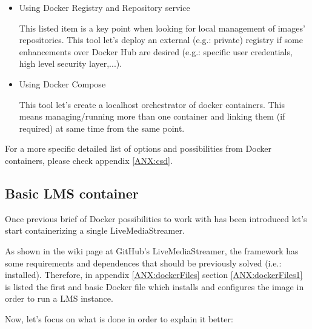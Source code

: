 \begin{itemize}
\begin{itemize}
	\item Using Docker Registry and Repository service

	This	 listed item is a key point when looking for local management of images' repositories. This tool let's deploy an external (e.g.: private) registry if some enhancements over Docker Hub are desired (e.g.: specific user credentials, high level security layer,...).
	
	\item Using Docker Compose
	
	This tool let's create a localhost orchestrator of docker containers. This means managing/running more than one container and linking them (if required) at same time from the same point.
	
	\end{itemize}
\end{itemize}

For a more specific detailed list of options and possibilities from Docker containers, please check appendix \ref{ANX:csd}.

\subsection{Basic LMS container}

Once previous brief of Docker possibilities to work with has been introduced let's start containerizing a single LiveMediaStreamer.

As shown in the wiki page at GitHub's LiveMediaStreamer, the framework has some requirements and dependences that should be previously solved (i.e.: installed). Therefore, in appendix \ref{ANX:dockerFiles} section \ref{ANX:dockerFiles1} is listed the first and basic Docker file which installs and configures the image in order to run a LMS instance. 

Now, let's focus on what is done in order to explain it better: 

